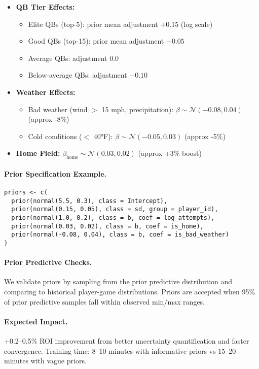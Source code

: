\begin{itemize}
  \item \textbf{QB Tier Effects:}
    \begin{itemize}
      \item Elite QBs (top-5): prior mean adjustment $+0.15$ (log scale)
      \item Good QBs (top-15): prior mean adjustment $+0.05$
      \item Average QBs: adjustment $0.0$
      \item Below-average QBs: adjustment $-0.10$
    \end{itemize}
  \item \textbf{Weather Effects:}
    \begin{itemize}
      \item Bad weather (wind $>$ 15 mph, precipitation): $\beta \sim \mathcal{N}(-0.08, 0.04)$ (approx -8\%)
      \item Cold conditions ($<$ 40°F): $\beta \sim \mathcal{N}(-0.05, 0.03)$ (approx -5\%)
    \end{itemize}
  \item \textbf{Home Field:} $\beta_{\text{home}} \sim \mathcal{N}(0.03, 0.02)$ (approx +3\% boost)
\end{itemize}

\paragraph{Prior Specification Example.}
\begin{verbatim}
priors <- c(
  prior(normal(5.5, 0.3), class = Intercept),
  prior(normal(0.15, 0.05), class = sd, group = player_id),
  prior(normal(1.0, 0.2), class = b, coef = log_attempts),
  prior(normal(0.03, 0.02), class = b, coef = is_home),
  prior(normal(-0.08, 0.04), class = b, coef = is_bad_weather)
)
\end{verbatim}

\paragraph{Prior Predictive Checks.}
We validate priors by sampling from the prior predictive distribution and comparing to historical player-game distributions. Priors are accepted when 95\% of prior predictive samples fall within observed min/max ranges.

\paragraph{Expected Impact.}
+0.2--0.5\% ROI improvement from better uncertainty quantification and faster convergence. Training time: 8--10 minutes with informative priors vs 15--20 minutes with vague priors.

